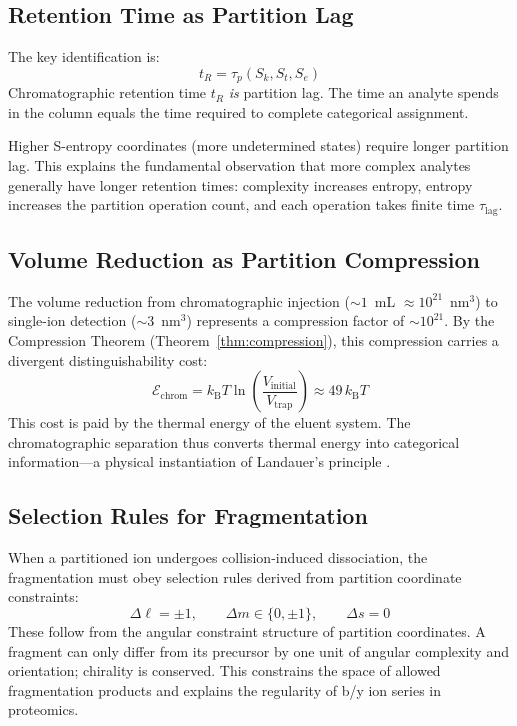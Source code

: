 \documentclass[twocolumn,10pt,a4paper]{article}
\theoremstyle{definition}
\theoremstyle{remark}
\newcommand{\kB}{k_{\mathrm{B}}}
\newcommand{\Cost}{\mathcal{E}}
\newcommand{\Lag}{\tau_{\mathrm{lag}}}
\newcommand{\taup}{\tau_p}
\begin{document}
\subsection{Retention Time as Partition Lag}

The key identification is:
\begin{equation}
    \boxed{t_R = \taup(S_k, S_t, S_e)}
    \label{eq:retention}
\end{equation}
Chromatographic retention time $t_R$ \emph{is} partition lag. The time an analyte spends in the column equals the time required to complete categorical assignment.

Higher S-entropy coordinates (more undetermined states) require longer partition lag. This explains the fundamental observation that more complex analytes generally have longer retention times: complexity increases entropy, entropy increases the partition operation count, and each operation takes finite time $\Lag$.

\subsection{Volume Reduction as Partition Compression}

The volume reduction from chromatographic injection ($\sim 1$~mL $\approx 10^{21}$~nm$^3$) to single-ion detection ($\sim 3$~nm$^3$) represents a compression factor of $\sim 10^{21}$. By the Compression Theorem (Theorem~\ref{thm:compression}), this compression carries a divergent distinguishability cost:
\begin{equation}
    \Cost_{\text{chrom}} = \kB T \ln\left(\frac{V_{\text{initial}}}{V_{\text{trap}}}\right) \approx 49\, \kB T
\end{equation}
This cost is paid by the thermal energy of the eluent system. The chromatographic separation thus converts thermal energy into categorical information---a physical instantiation of Landauer's principle \citep{landauer1961}.

\subsection{Selection Rules for Fragmentation}

When a partitioned ion undergoes collision-induced dissociation, the fragmentation must obey selection rules derived from partition coordinate constraints:
\begin{equation}
    \Delta\ell = \pm 1, \qquad \Delta m \in \{0, \pm 1\}, \qquad \Delta s = 0
    \label{eq:selection}
\end{equation}
These follow from the angular constraint structure of partition coordinates. A fragment can only differ from its precursor by one unit of angular complexity and orientation; chirality is conserved. This constrains the space of allowed fragmentation products and explains the regularity of b/y ion series in proteomics.
\end{document}
